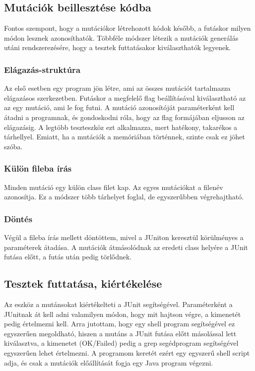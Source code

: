 \subsection{Mutációk beillesztése kódba}
Fontos szempont, hogy a mutációkor létrehozott kódok később, a futáskor milyen módon lesznek azonosíthatók. Többféle módszer létezik a mutációk generálás utáni rendszerezésére, hogy a tesztek futtatásakor kiválaszthatók legyenek.
\subsubsection{Elágazás-struktúra}
Az első esetben egy program jön létre, ami az összes mutációt tartalmazza elágazásos szerkezetben. Futáskor a megfelelő flag beállításával kiválasztható az az egy mutáció, ami le fog futni. A mutáció azonosítóját paraméterként kell átadni a programnak, és gondoskodni róla, hogy az flag formájában eljusson az elágazásig. A legtöbb teszteszköz ezt alkalmazza, mert hatékony, takarékos a tárhellyel. Emiatt, ha a mutációk a memóriában történnek, szinte csak ez jöhet szóba.
\subsubsection{Külön fileba írás}
Minden mutáció egy külön class filet kap. Az egyes mutációkat a filenév azonosítja. Ez a módszer több tárhelyet foglal, de egyszerűbben végrehajtható.
\subsubsection{Döntés}
Végül a fileba írás mellett döntöttem, mivel a JUniton keresztül körülményes a paraméterek átadása. A mutációk átmásolódnak az eredeti class helyére a JUnit futása előtt, a futás után pedig törlődnek.
\subsection{Tesztek futtatása, kiértékelése}
Az eszköz a mutánsokat kiértékelteti a JUnit segítségével. Paraméterként a JUnitnak át kell adni valamilyen módon, hogy mit hajtson végre, a kimenetét pedig értelmezni kell. Arra jutottam, hogy egy shell program segítségével ez egyszerűen megoldható, hiszen a mutáns a JUnit futása előtt másolással lett kiválasztva, a kimenetet (OK/Failed) pedig a grep segédprogram segítségével egyszerűen lehet értelmezni. A programom keretét ezért egy egyszerű shell script adja, és csak a mutációk előállítását fogja egy Java program végezni.
